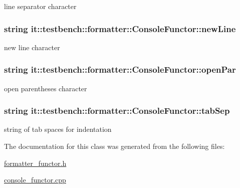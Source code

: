 line separator character \hypertarget{classit_1_1testbench_1_1formatter_1_1ConsoleFunctor_aa10735dbd1a676f0bfa646b713381b10}{
\subsubsection[{new\-Line}]{\setlength{\rightskip}{0pt plus 5cm}string it\-::testbench\-::formatter\-::\-Console\-Functor\-::new\-Line\hspace{0.3cm}{\ttfamily [private]}}}\label{d2/d36/classit_1_1testbench_1_1formatter_1_1ConsoleFunctor_aa10735dbd1a676f0bfa646b713381b10}
new line character \hypertarget{classit_1_1testbench_1_1formatter_1_1ConsoleFunctor_a24b520f4b3dd76076844874a92bd5102}{
\subsubsection[{open\-Par}]{\setlength{\rightskip}{0pt plus 5cm}string it\-::testbench\-::formatter\-::\-Console\-Functor\-::open\-Par\hspace{0.3cm}{\ttfamily [private]}}}\label{d2/d36/classit_1_1testbench_1_1formatter_1_1ConsoleFunctor_a24b520f4b3dd76076844874a92bd5102}
open parentheses character \hypertarget{classit_1_1testbench_1_1formatter_1_1ConsoleFunctor_a01ae95da7ab7c9ca2f1bbfc2ab75994b}{
\subsubsection[{tab\-Sep}]{\setlength{\rightskip}{0pt plus 5cm}string it\-::testbench\-::formatter\-::\-Console\-Functor\-::tab\-Sep\hspace{0.3cm}{\ttfamily [private]}}}\label{d2/d36/classit_1_1testbench_1_1formatter_1_1ConsoleFunctor_a01ae95da7ab7c9ca2f1bbfc2ab75994b}
string of tab spaces for indentation 

The documentation for this class was generated from the following files\-:\begin{DoxyCompactItemize}
\item 
\hyperlink{formatter__functor_8h}{formatter\-\_\-functor.\-h}\item 
\hyperlink{console__functor_8cpp}{console\-\_\-functor.\-cpp}\end{DoxyCompactItemize}
